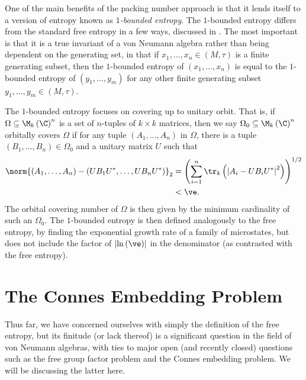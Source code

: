 \documentclass[10pt]{mypackage}
\begin{document}
One of the main benefits of the packing number approach is that it lends itself to a version of entropy known as \textit{$1$-bounded entropy}. The $1$-bounded entropy differs from the standard free entropy in a few ways, discussed in \cite[Section 2]{hayes2021propertytstrong1boundedness}. The most important is that it is a true invariant of a von Neumann algebra rather than being dependent on the generating set, in that if $x_1,\dots,x_n\in \left( M,\tau \right)$ is a finite generating subset, then the $1$-bounded entropy of $\left( x_1,\dots,x_n \right)$ is equal to the $1$-bounded entropy of $\left( y_1,\dots,y_m \right)$ for any other finite generating subset $y_1,\dots,y_m\in \left( M,\tau \right)$.

The $1$-bounded entropy focuses on covering up to unitary orbit. That is, if $\Omega\subseteq \M_k\left( \C \right)^{n}$ is a set of $n$-tuples of $k\times k$ matrices, then we say $\Omega_0\subseteq \M_k\left( \C \right)^{n}$ orbitally covers $\Omega$ if for any tuple $\left( A_1,\dots,A_n \right)$ in $\Omega$, there is a tuple $\left( B_1,\dots,B_n \right)\in \Omega_0$ and a unitary matrix $U$ such that
\begin{align*}
  \norm{\left( A_1,\dots,A_n \right)- \left( UB_1U^{\ast},\dots,UB_nU^{\ast} \right)}_{2} &= \left( \sum_{i=1}^{n}\tr_k\left( \left\vert A_i-UB_iU^{\ast} \right\vert^2 \right) \right)^{1/2}\\
                                                                                          &<\ve. 
\end{align*}
The orbital covering number of $\Omega$ is then given by the minimum cardinality of such an $\Omega_0$. The $1$-bounded entropy is then defined analogously to the free entropy, by finding the exponential growth rate of a family of microstates, but does not include the factor of $\left\vert \ln\left( \ve \right) \right\vert$ in the denominator (as contrasted with the free entropy).
\section{The Connes Embedding Problem}%
Thus far, we have concerned ourselves with simply the definition of the free entropy, but its finitude (or lack thereof) is a significant question in the field of von Neumann algebras, with ties to major open (and recently closed) questions such as the free group factor problem and the Connes embedding problem. We will be discussing the latter here.
\end{document}
